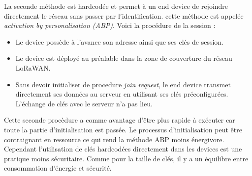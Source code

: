 \vspace{0.1cm}
        
La seconde méthode est hardcodée et permet à un end device de rejoindre directement le réseau sans passer par l'identification. cette méthode est appelée \textit{activation by personalisation (ABP)}. Voici la procédure de la session :
\begin{itemize}
\item Le device possède à l'avance son adresse ainsi que ses clés de session.
\item Le device est déployé au préalable dans la zone de couverture du réseau LoRaWAN.
\item Sans devoir initialiser de procedure \textit{join request}, le end device transmet directement ses données au serveur en utilisant ses clés préconfigurées. L'échange de clés avec le serveur n'a pas lieu.
\end{itemize}

Cette seconde procèdure a comme avantage d'être plus rapide à exécuter car toute la partie d'initialisation est passée. Le processus d'initialisation peut être contraignant en ressource ce qui rend la méthode ABP moins énergivore. Cependant l'utilisation de clés hardcodées directement dans les devices est une pratique moins sécuritaire. Comme pour la taille de clés, il y a un équilibre entre consommation d'énergie et sécurité.
